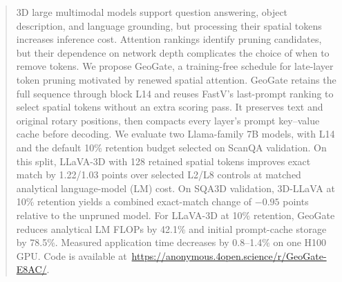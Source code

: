 \begin{abstract}
3D large multimodal models support question answering, object description, and language grounding, but processing their spatial tokens increases inference cost. Attention rankings identify pruning candidates, but their dependence on network depth complicates the choice of when to remove tokens. We propose GeoGate, a training-free schedule for late-layer token pruning motivated by renewed spatial attention. GeoGate retains the full sequence through block L14 and reuses FastV's last-prompt ranking to select spatial tokens without an extra scoring pass. It preserves text and original rotary positions, then compacts every layer's prompt key--value cache before decoding. We evaluate two Llama-family 7B models, with L14 and the default 10\% retention budget selected on ScanQA validation. On this split, LLaVA-3D with 128 retained spatial tokens improves exact match by 1.22/1.03 points over selected L2/L8 controls at matched analytical language-model (LM) cost. On SQA3D validation, 3D-LLaVA at 10\% retention yields a combined exact-match change of $-0.95$ points relative to the unpruned model. For LLaVA-3D at 10\% retention, GeoGate reduces analytical LM FLOPs by 42.1\% and initial prompt-cache storage by 78.5\%. Measured application time decreases by 0.8--1.4\% on one H100 GPU.
Code is available at~\url{https://anonymous.4open.science/r/GeoGate-E8AC/}.
\end{abstract}
